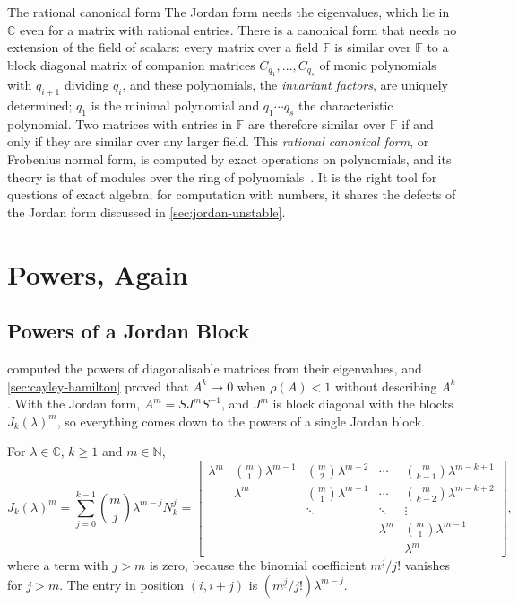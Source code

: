 \begin{note}{The rational canonical form}
The Jordan form needs the eigenvalues, which lie in $\mathbb C$ even for a matrix with rational entries. There is a canonical form that needs no extension of the field of scalars: every matrix over a field $\mathbb F$ is similar over $\mathbb F$ to a block diagonal matrix of companion matrices $C_{q_1},\ldots,C_{q_s}$ of monic polynomials with $q_{i+1}$ dividing $q_i$, and these polynomials, the \emph{invariant factors}, are uniquely determined; $q_1$ is the minimal polynomial and $q_1\cdots q_s$ the characteristic polynomial. Two matrices with entries in $\mathbb F$ are therefore similar over $\mathbb F$ if and only if they are similar over any larger field. This \emph{rational canonical form}, or Frobenius normal form, is computed by exact operations on polynomials, and its theory is that of modules over the ring of polynomials~\cite[Chap.~7]{hoffman1971}. It is the right tool for questions of exact algebra; for computation with numbers, it shares the defects of the Jordan form discussed in \cref{sec:jordan-unstable}.
\end{note}

\section{Powers, Again}
\label{sec:powers-again}

\subsection{Powers of a Jordan Block}

 computed the powers of diagonalisable matrices from their eigenvalues, and \cref{sec:cayley-hamilton} proved that $A^k\to0$ when $\rho(A)<1$ without describing $A^k$. With the Jordan form, $A^m=SJ^mS^{-1}$, and $J^m$ is block diagonal with the blocks $J_k(\lambda)^m$, so everything comes down to the powers of a single Jordan block.

\begin{proposition}
\label{prop:jordan-block-powers}
For $\lambda\in\mathbb C$, $k\ge1$ and $m\in\mathbb N$,
\[
J_k(\lambda)^m=\sum_{j=0}^{k-1}\binom mj\lambda^{m-j}N_k^j=\begin{bmatrix}\lambda^m&\binom m1\lambda^{m-1}&\binom m2\lambda^{m-2}&\cdots&\binom m{k-1}\lambda^{m-k+1}\\&\lambda^m&\binom m1\lambda^{m-1}&\cdots&\binom m{k-2}\lambda^{m-k+2}\\&&\ddots&\ddots&\vdots\\&&&\lambda^m&\binom m1\lambda^{m-1}\\&&&&\lambda^m\end{bmatrix},
\]
where a term with $j>m$ is zero, because the binomial coefficient $m^{\underline j}/j!$ vanishes for $j>m$. The entry in position $(i,i+j)$ is $(m^{\underline j}/j!)\lambda^{m-j}$.
\end{proposition}


